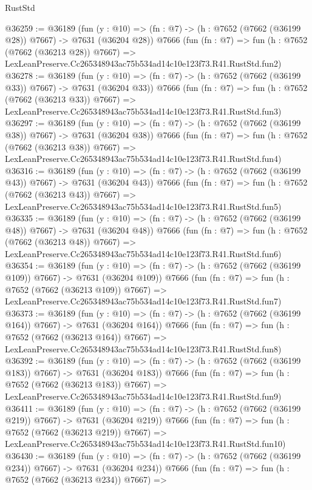 \begin{lexlean}{RustStd}
\begin{coremodule}
@36259 := @36189
    (fun (y : @10) => (fn : @7) -> (h : @7652 (@7662 (@36199 @28)) @7667) -> @7631 (@36204 @28))
    @7666
    (fun (fn : @7) =>
    fun (h : @7652 (@7662 (@36213 @28)) @7667) =>
    LexLeanPreserve.Cc265348943ac75b534ad14c10e123f73.R41.RustStd.fun2)
@36278 := @36189
    (fun (y : @10) => (fn : @7) -> (h : @7652 (@7662 (@36199 @33)) @7667) -> @7631 (@36204 @33))
    @7666
    (fun (fn : @7) =>
    fun (h : @7652 (@7662 (@36213 @33)) @7667) =>
    LexLeanPreserve.Cc265348943ac75b534ad14c10e123f73.R41.RustStd.fun3)
@36297 := @36189
    (fun (y : @10) => (fn : @7) -> (h : @7652 (@7662 (@36199 @38)) @7667) -> @7631 (@36204 @38))
    @7666
    (fun (fn : @7) =>
    fun (h : @7652 (@7662 (@36213 @38)) @7667) =>
    LexLeanPreserve.Cc265348943ac75b534ad14c10e123f73.R41.RustStd.fun4)
@36316 := @36189
    (fun (y : @10) => (fn : @7) -> (h : @7652 (@7662 (@36199 @43)) @7667) -> @7631 (@36204 @43))
    @7666
    (fun (fn : @7) =>
    fun (h : @7652 (@7662 (@36213 @43)) @7667) =>
    LexLeanPreserve.Cc265348943ac75b534ad14c10e123f73.R41.RustStd.fun5)
@36335 := @36189
    (fun (y : @10) => (fn : @7) -> (h : @7652 (@7662 (@36199 @48)) @7667) -> @7631 (@36204 @48))
    @7666
    (fun (fn : @7) =>
    fun (h : @7652 (@7662 (@36213 @48)) @7667) =>
    LexLeanPreserve.Cc265348943ac75b534ad14c10e123f73.R41.RustStd.fun6)
@36354 := @36189
    (fun (y : @10) => (fn : @7) -> (h : @7652 (@7662 (@36199 @109)) @7667) -> @7631 (@36204 @109))
    @7666
    (fun (fn : @7) =>
    fun (h : @7652 (@7662 (@36213 @109)) @7667) =>
    LexLeanPreserve.Cc265348943ac75b534ad14c10e123f73.R41.RustStd.fun7)
@36373 := @36189
    (fun (y : @10) => (fn : @7) -> (h : @7652 (@7662 (@36199 @164)) @7667) -> @7631 (@36204 @164))
    @7666
    (fun (fn : @7) =>
    fun (h : @7652 (@7662 (@36213 @164)) @7667) =>
    LexLeanPreserve.Cc265348943ac75b534ad14c10e123f73.R41.RustStd.fun8)
@36392 := @36189
    (fun (y : @10) => (fn : @7) -> (h : @7652 (@7662 (@36199 @183)) @7667) -> @7631 (@36204 @183))
    @7666
    (fun (fn : @7) =>
    fun (h : @7652 (@7662 (@36213 @183)) @7667) =>
    LexLeanPreserve.Cc265348943ac75b534ad14c10e123f73.R41.RustStd.fun9)
@36411 := @36189
    (fun (y : @10) => (fn : @7) -> (h : @7652 (@7662 (@36199 @219)) @7667) -> @7631 (@36204 @219))
    @7666
    (fun (fn : @7) =>
    fun (h : @7652 (@7662 (@36213 @219)) @7667) =>
    LexLeanPreserve.Cc265348943ac75b534ad14c10e123f73.R41.RustStd.fun10)
@36430 := @36189
    (fun (y : @10) => (fn : @7) -> (h : @7652 (@7662 (@36199 @234)) @7667) -> @7631 (@36204 @234))
    @7666
    (fun (fn : @7) =>
    fun (h : @7652 (@7662 (@36213 @234)) @7667) =>

\end{coremodule}
\end{lexlean}
